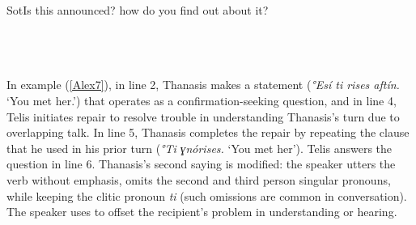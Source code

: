 \documentclass[output=paper]{LSP/langsci}
\begin{document}
\begin{Transcript}[FS {>}{>\hspace{0.1in}}]{Sot}{Is this announced? how do you find out about it?}%
\label{Alex6}%
\\
\\
 \\
  \\
\end{Transcript}

In example (\ref{Alex7}), in line 2, Thanasis makes a statement (\textit{°Εsí ti \underline{}rises aftín.} `You met her.') that operates as a confirmation-seeking question, and in line 4, Telis initiates repair to resolve trouble in understanding Thanasis’s turn due to overlapping talk. In line 5, Thanasis completes the repair by repeating the clause that he used in his prior turn (\textit{°Τi ɣnórises.} `You met her'). Telis answers the question in line 6. Thanasis’s second saying is modified: the speaker utters the verb without emphasis, omits the second and third person singular pronouns, while keeping the clitic pronoun \textit{ti} (such omissions are common in  conversation). The speaker uses  to offset the recipient’s problem in understanding or hearing. 
\end{document}

